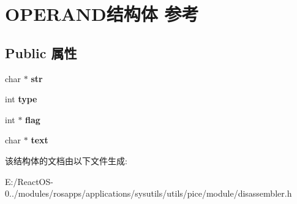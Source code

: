 \hypertarget{struct_o_p_e_r_a_n_d}{}\section{O\+P\+E\+R\+A\+N\+D结构体 参考}
\label{struct_o_p_e_r_a_n_d}
\subsection*{Public 属性}
\begin{DoxyCompactItemize}
\item 
\mbox{\label{struct_o_p_e_r_a_n_d_a3920a4769c5bdeae5077058cd63c8bf8}} 
char $\ast$ {\bfseries str}
\item 
\mbox{\label{struct_o_p_e_r_a_n_d_a57d29b33b5e13f3cae0d9e82e81c4186}} 
int {\bfseries type}
\item 
\mbox{\label{struct_o_p_e_r_a_n_d_a990316dffa316faaa9455d9d9590f531}} 
int $\ast$ {\bfseries flag}
\item 
\mbox{\label{struct_o_p_e_r_a_n_d_acf4e3186fc0ab746d998476445a1b89e}} 
char $\ast$ {\bfseries text}
\end{DoxyCompactItemize}


该结构体的文档由以下文件生成\+:\begin{DoxyCompactItemize}
\item 
E\+:/\+React\+O\+S-\/0../modules/rosapps/applications/sysutils/utils/pice/module/disassembler.\+h\end{DoxyCompactItemize}
